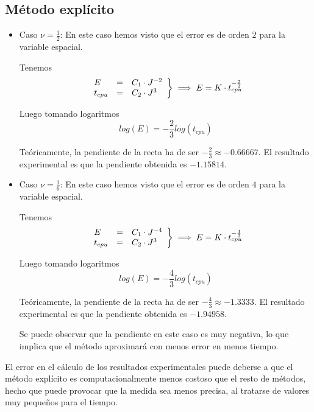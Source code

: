 \documentclass[spanish]{mathnotes}
\begin{document}
	\subsection{Método explícito}
	\begin{itemize}
		\item Caso $\nu = \frac{1}{2}$:	En este caso hemos visto que el error es de orden $2$ para la variable espacial.
		
		Tenemos 
		\begin{equation*}
		\left.
			\begin{array}{l l l}
			E &=& C_1 \cdot J^{-2}\\
			t_{cpu} &=& C_2 \cdot J^3
			\end{array}
		\right\} \implies E = K\cdot  t_{cpu}^{-\frac{2}{3}}
		\end{equation*}
		
		Luego tomando logaritmos
		$$log(E) = -\frac{2}{3}log(t_{cpu})$$
		
		Teóricamente, la pendiente de la recta ha de ser $-\frac{2}{3}\approx -0.66667$. El resultado experimental es que la pendiente obtenida es $-1.15814$.
		
		\item Caso $\nu = \frac{1}{6}$:	En este caso hemos visto que el error es de orden $4$ para la variable espacial.
		
		Tenemos 
		\begin{equation*}
			\left.
			\begin{array}{l l l}
				E &=& C_1 \cdot J^{-4}\\
				t_{cpu} &=& C_2 \cdot J^3
			\end{array}
			\right\} \implies E = K\cdot  t_{cpu}^{-\frac{4}{3}}
		\end{equation*}
		
		Luego tomando logaritmos
		$$log(E) = -\frac{4}{3}log(t_{cpu})$$
		
		Teóricamente, la pendiente de la recta ha de ser $-\frac{4}{3} \approx -1.3333$. El resultado experimental es que la pendiente obtenida es $-1.94958$.
		
		Se puede observar que la pendiente en este caso es muy negativa, lo que implica que el método aproximará con menos error en menos tiempo.
	\end{itemize}
	
	El error en el cálculo de los resultados experimentales puede deberse a que el método explícito es computacionalmente menos costoso que el resto de métodos, hecho que puede provocar que la medida sea menos precisa, al tratarse de valores muy pequeños para el tiempo.
	
\end{document}
